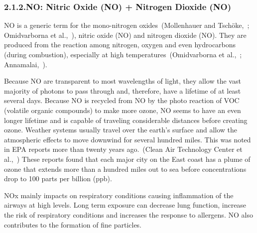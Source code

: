 \documentclass[9pt]{report}
\begin{document}
\subsubsection{2.1.2.\hspace*{0.5em}NO: Nitric Oxide (NO) + Nitrogen Dioxide (NO)}\label{sec-nox--nitric-oxide-no-nitrogen-dioxide-no2}%

\noindent{}NO is a generic term for the mono-nitrogen oxides~(Mollenhauer and Tschöke,~; Omidvarborna et al.,~), nitric oxide (NO) and nitrogen dioxide (NO).
They are produced from the reaction among nitrogen, oxygen and even hydrocarbons (during combustion), especially at high temperatures~(Omidvarborna et al.,~; Annamalai,~).%

Because NO are transparent to most wavelengths of light, they allow the vast majority of photons to pass through and, therefore, have a lifetime of at least several days. 
Because NO is  recycled from NO by the photo reaction of VOC (volatile organic compounds) to make more ozone, NO seems to have an even longer lifetime and is capable of traveling considerable distances before creating ozone.  Weather systems usually travel over the earth’s surface and allow the atmospheric effects to move downwind for several hundred miles.
This was noted in EPA reports more than twenty years ago.~(Clean Air Technology Center et al.,~)
These reports found that each major city on the East coast has a plume of ozone that extends more than a hundred miles out to sea before concentrations drop to 100 parts per billion (ppb).%

NOx mainly impacts on respiratory conditions causing inflammation of the airways at high levels. Long term exposure can decrease lung function, increase the risk of respiratory conditions and increases the response to allergens. 
NO also contributes to the formation of fine particles.%
\end{document}
